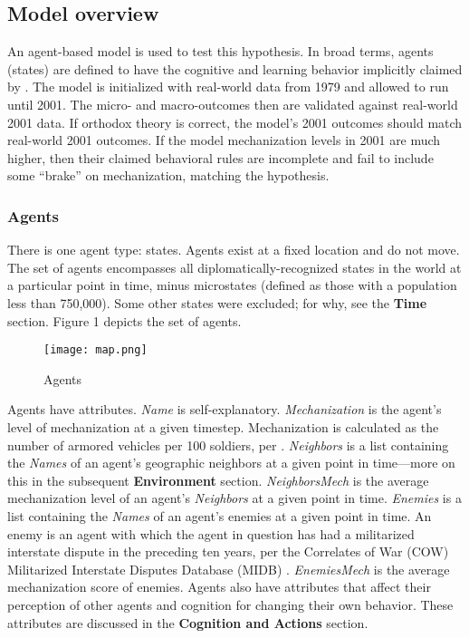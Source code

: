 \documentclass{article}
\begin{document}
\subsection{Model overview}

An agent-based model is used to test this hypothesis. In broad
terms, agents (states) are defined to have the cognitive and learning behavior
implicitly claimed by \citet{sechser2010army}. The model is initialized with
real-world data from 1979 and allowed to run until 2001. The micro- and
macro-outcomes then are validated against real-world 2001 data. If
orthodox theory is correct, the model's 2001 outcomes should match
real-world 2001 outcomes. If the model mechanization levels in 2001 are much
higher, then their claimed behavioral rules are incomplete and fail to include
some ``brake'' on mechanization, matching the hypothesis. 

\subsubsection{Agents}

There is one agent type: states. Agents exist at a fixed location and do not
move. The set of agents encompasses all diplomatically-recognized 
states in the world at a particular point in time, minus microstates (defined as
those with a population less than 750,000). Some other states were excluded; for
why, see the \textbf{Time} section. Figure 1 depicts the set of agents.

\begin{figure}[h!]
	\centering
	\caption{Agents}
	\texttt{[image: map.png]}
\end{figure}

Agents have attributes. \textit{Name} is self-explanatory.
\textit{Mechanization} is the agent's level of mechanization at a given
timestep. Mechanization is calculated as the number of armored vehicles per 100
soldiers, per \citet{sechser2010army}. \textit{Neighbors} is a list containing
the \textit{Names} of an agent's geographic neighbors at a given point in
time---more on this in the subsequent \textbf{Environment} section. \textit{NeighborsMech} is the
average mechanization level of an agent's \textit{Neighbors} at a given point in
time. \textit{Enemies} is a list containing the \textit{Names} of an agent's
enemies at a given point in time. An enemy is an agent with which the agent in
question has had a militarized interstate dispute in the preceding ten years,
per the Correlates of War (COW) Militarized Interstate Disputes Database (MIDB)
\citep{cow_midb}. \textit{EnemiesMech} is the average mechanization score of
enemies. Agents also have attributes that affect their
perception of other agents and cognition for changing their own behavior. These
attributes are discussed in the \textbf{Cognition and Actions} section.
\end{document}
